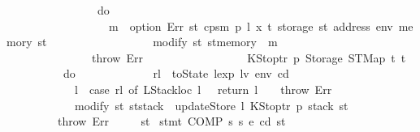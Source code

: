 \begin{isabellebody}
\ \ \ \ \ \ \ \ \ \ \ \ \ \ \ \ do\ {\isacharbraceleft}{\kern0pt}\isanewline
\ \ \ \ \ \ \ \ \ \ \ \ \ \ \ \ \ \ m\ {\isasymleftarrow}\ option\ Err\ {\isacharparenleft}{\kern0pt}{\isasymlambda}st{\isachardot}{\kern0pt}\ cps{}m\ p\ l\ x\ t\ {\isacharparenleft}{\kern0pt}storage\ st\ {\isacharparenleft}{\kern0pt}address\ env{\isacharparenright}{\kern0pt}{\isacharparenright}{\kern0pt}\ {\isacharparenleft}{\kern0pt}memory\ st{\isacharparenright}{\kern0pt}{\isacharparenright}{\kern0pt}{\isacharsemicolon}{\kern0pt}\isanewline
\ \ \ \ \ \ \ \ \ \ \ \ \ \ \ \ \ \ modify\ {\isacharparenleft}{\kern0pt}{\isasymlambda}st{\isachardot}{\kern0pt}\ st{\isasymlparr}memory\ {\isacharcolon}{\kern0pt}{\isacharequal}{\kern0pt}\ m{\isasymrparr}{\isacharparenright}{\kern0pt}\isanewline
\ \ \ \ \ \ \ \ \ \ \ \ \ \ \ \ {\isacharbraceright}{\kern0pt}\isanewline
\ \ \ \ \ \ \ \ \ \ \ \ {\isacharbar}{\kern0pt}\ {\isacharunderscore}{\kern0pt}\ {\isasymRightarrow}\ throw\ Err\isanewline
\ \ \ \ \ \ \ \ \ \ {\isacharbraceright}{\kern0pt}\isanewline
\ \ \ \ \ \ {\isacharbar}{\kern0pt}\ {\isacharparenleft}{\kern0pt}KStoptr\ p{\isacharcomma}{\kern0pt}\ Storage\ {\isacharparenleft}{\kern0pt}STMap\ t\ t{\isacharprime}{\kern0pt}{\isacharparenright}{\kern0pt}{\isacharparenright}{\kern0pt}\ {\isasymRightarrow}\isanewline
\ \ \ \ \ \ \ \ \ \ do\ {\isacharbraceleft}{\kern0pt}\isanewline
\ \ \ \ \ \ \ \ \ \ \ \ rl\ {\isasymleftarrow}\ toState\ {\isacharparenleft}{\kern0pt}lexp\ lv\ env\ cd{\isacharparenright}{\kern0pt}{\isacharsemicolon}{\kern0pt}\isanewline
\ \ \ \ \ \ \ \ \ \ \ \ l\ {\isasymleftarrow}\ case\ rl\ of\ {\isacharparenleft}{\kern0pt}LStackloc\ l{\isacharcomma}{\kern0pt}\ {\isacharunderscore}{\kern0pt}{\isacharparenright}{\kern0pt}\ {\isasymRightarrow}\ return\ l\ {\isacharbar}{\kern0pt}\ {\isacharunderscore}{\kern0pt}\ {\isasymRightarrow}\ throw\ Err{\isacharsemicolon}{\kern0pt}\isanewline
\ \ \ \ \ \ \ \ \ \ \ \ modify\ {\isacharparenleft}{\kern0pt}{\isasymlambda}st{\isachardot}{\kern0pt}\ st{\isasymlparr}stack\ {\isacharcolon}{\kern0pt}{\isacharequal}{\kern0pt}\ updateStore\ l\ {\isacharparenleft}{\kern0pt}KStoptr\ p{\isacharparenright}{\kern0pt}\ {\isacharparenleft}{\kern0pt}stack\ st{\isacharparenright}{\kern0pt}{\isasymrparr}{\isacharparenright}{\kern0pt}\isanewline
\ \ \ \ \ \ \ \ \ \ {\isacharbraceright}{\kern0pt}\isanewline
\ \ \ \ \ \ {\isacharbar}{\kern0pt}\ {\isacharunderscore}{\kern0pt}\ {\isasymRightarrow}\ throw\ Err\isanewline
\ \ \ \ {\isacharbraceright}{\kern0pt}{\isacharparenright}{\kern0pt}\ st{\isachardoublequoteclose}\isanewline
{\isacharbar}{\kern0pt}\ {\isachardoublequoteopen}stmt\ {\isacharparenleft}{\kern0pt}COMP\ s{}\ s{}{\isacharparenright}{\kern0pt}\ e\ cd\ st\ {\isacharequal}{\kern0pt}\isanewline

\end{isabellebody}
